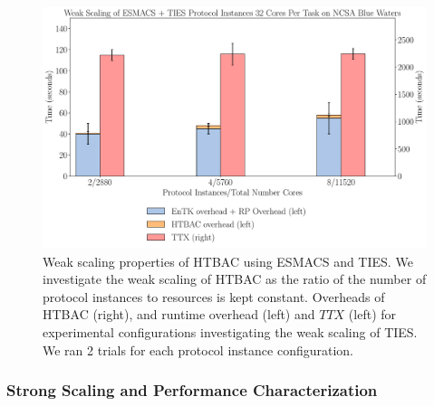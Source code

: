 \begin{figure}
  \centering
    \includegraphics[width=\columnwidth]{figures/new_ws_esmacs_ties.pdf}
    \caption{Weak scaling properties of HTBAC using ESMACS and TIES. We 
    investigate the weak scaling of HTBAC as the ratio of the number of protocol 
    instances to resources is kept constant. Overheads of HTBAC (right), and 
    runtime overhead (left) and \(TTX\) (left) for experimental configurations
    investigating the weak scaling of TIES. We ran 2 trials for each protocol
    instance configuration.}
\label{fig:weak_scaling_ESMACS_TIES}
\end{figure}



\subsubsection{Strong Scaling and Performance Characterization}


